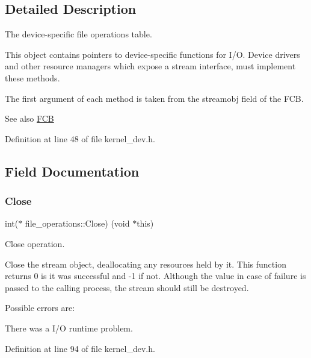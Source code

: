 \subsection{Detailed Description}
The device-\/specific file operations table. 

This object contains pointers to device-\/specific functions for I/O. Device drivers and other resource managers which expose a stream interface, must implement these methods.

The first argument of each method is taken from the \textquotesingle{}streamobj\textquotesingle{} field of the F\+CB. \begin{DoxySeeAlso}{See also}
\hyperlink{group__rlists_ga60c6c294fa1d8ea73ed270404fe5c17d}{F\+CB} 
\end{DoxySeeAlso}


Definition at line 48 of file kernel\+\_\+dev.\+h.



\subsection{Field Documentation}
\mbox{\label{structfile__operations_a66cfe706a1a29e3e58c7694dbd801b0f}} 
\subsubsection{\texorpdfstring{Close}{Close}}
{\footnotesize\ttfamily int($\ast$ file\+\_\+operations\+::\+Close) (void $\ast$this)}



Close operation. 

Close the stream object, deallocating any resources held by it. This function returns 0 is it was successful and -\/1 if not. Although the value in case of failure is passed to the calling process, the stream should still be destroyed.

Possible errors are\+:
\begin{DoxyItemize}
\item There was a I/O runtime problem. 
\end{DoxyItemize}

Definition at line 94 of file kernel\+\_\+dev.\+h.

\mbox{\label{structfile__operations_a2732da2af03e1fc7ba0b63a529ab1411}} 
